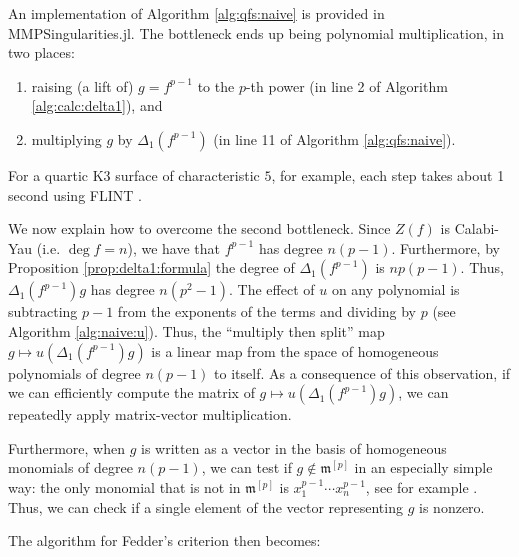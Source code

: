 


An implementation of Algorithm \ref{alg:qfs:naive}
is provided in MMPSingularities.jl.
The bottleneck ends up being polynomial multiplication, 
in two places:
\begin{enumerate}[(1)]
    \item raising (a lift of) \(g = f^{p-1}\) to the \(p\)-th power 
        (in line 2 of Algorithm \ref{alg:calc:delta1}), and
    \item multiplying \(g\) by \(\Delta_{1}(f^{p-1})\) 
        (in line 11 of Algorithm \ref{alg:qfs:naive}).
\end{enumerate}

\noindent For a quartic K3 surface of characteristic \(5\),
for example, each step takes about 1 second 
using FLINT \cite{flint-2023-flint}. 

We now explain how to overcome the second
bottleneck. Since \(Z(f)\) is Calabi-Yau
(i.e. \(\deg f = n\)), we have that \(f^{p-1}\) has degree
\(n(p-1)\). 
Furthermore, by Proposition \ref{prop:delta1:formula}
the degree of \(\Delta_{1}(f^{p-1})\) 
is \(np(p - 1)\).
Thus, \(\Delta_{1}(f^{p-1})g\) has degree
\(n(p^{2} - 1)\).
The effect 
of \(u\) on any polynomial is subtracting \(p-1\)
from the exponents of the terms and dividing by \(p\) 
(see Algorithm \ref{alg:naive:u}).
Thus, the ``multiply then split'' map 
\(g \mapsto u(\Delta_{1}(f^{p-1}) g)\) 
is a linear map from 
the space of homogeneous polynomials of degree \(n(p-1)\) 
to itself.
As a consequence of this observation,
if we can efficiently compute the matrix of 
\(g \mapsto u(\Delta_{1}(f^{p-1})g)\),
we can repeatedly apply matrix-vector multiplication.

Furthermore, when \(g\) is written as a vector 
in the basis of homogeneous monomials of degree
\(n(p-1)\), we can test if \(g \notin \mathfrak{m}^{[p]}\) 
in an especially simple way: the only 
monomial that is not in \(\mathfrak{m}^{[p]}\) is
\(x_{1}^{p-1}\cdots x_{n}^{p-1}\), 
see for example \cite{kty-2022-fedder}.
Thus, we can check if a single element of the vector representing
\(g\) is nonzero.

The algorithm for Fedder's criterion then becomes:

